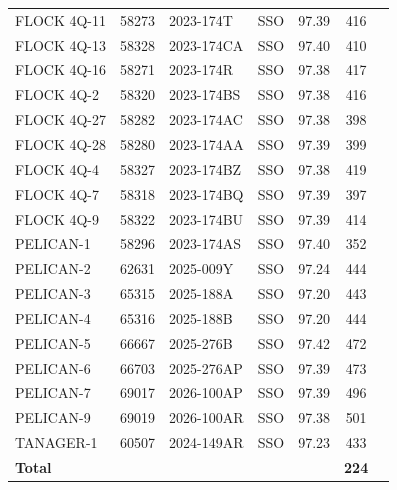 \begin{longtable}{p{3.5cm}lllccc}
FLOCK 4Q-11 & 58273 & 2023-174T & SSO & 97.39 & 416 \\
FLOCK 4Q-13 & 58328 & 2023-174CA & SSO & 97.40 & 410 \\
FLOCK 4Q-16 & 58271 & 2023-174R & SSO & 97.38 & 417 \\
FLOCK 4Q-2 & 58320 & 2023-174BS & SSO & 97.38 & 416 \\
FLOCK 4Q-27 & 58282 & 2023-174AC & SSO & 97.38 & 398 \\
FLOCK 4Q-28 & 58280 & 2023-174AA & SSO & 97.39 & 399 \\
FLOCK 4Q-4 & 58327 & 2023-174BZ & SSO & 97.38 & 419 \\
FLOCK 4Q-7 & 58318 & 2023-174BQ & SSO & 97.39 & 397 \\
FLOCK 4Q-9 & 58322 & 2023-174BU & SSO & 97.39 & 414 \\
PELICAN-1 & 58296 & 2023-174AS & SSO & 97.40 & 352 \\
PELICAN-2 & 62631 & 2025-009Y & SSO & 97.24 & 444 \\
PELICAN-3 & 65315 & 2025-188A & SSO & 97.20 & 443 \\
PELICAN-4 & 65316 & 2025-188B & SSO & 97.20 & 444 \\
PELICAN-5 & 66667 & 2025-276B & SSO & 97.42 & 472 \\
PELICAN-6 & 66703 & 2025-276AP & SSO & 97.39 & 473 \\
PELICAN-7 & 69017 & 2026-100AP & SSO & 97.39 & 496 \\
PELICAN-9 & 69019 & 2026-100AR & SSO & 97.38 & 501 \\
TANAGER-1 & 60507 & 2024-149AR & SSO & 97.23 & 433 \\
\midrule
\multicolumn{5}{l}{\textbf{Total}} & \textbf{224} \\
\end{longtable}
